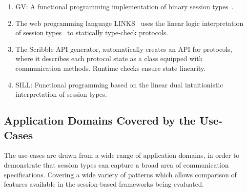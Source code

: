 \begin{enumerate}
	\item	GV:	A functional programming implementation of binary session types~\cite{DBLP:journals/jfp/Wadler14}.

	\item	The web programming language LINKS~\cite{citation_needed}
			uses the linear logic interpretation of session types~\cite{DBLP:journals/jfp/Wadler14}
			to statically type-check protocols.

	\item	The Scribble API generator, automatically creates an API for protocols,
			where it describes each protocol state as a class equipped with
			communication methods. Runtime checks ensure state linearity.

	\item	SILL:		Functional programming based on the linear dual intuitionistic interpretation of session types. 


\end{enumerate}

\subsection{Application Domains Covered by the Use-Cases}

The use-cases are drawn from a wide range of
application domains, in order to demonstrate that
session types can capture
a broad area of communication specifications.
Covering a wide variety of patterns which allows comparison of features available in the session-based frameworks being evaluated. 





